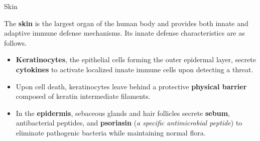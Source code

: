   \begin{core}{Skin}

    The \textbf{skin} is the largest organ of the human body and provides both innate and adaptive immune defense mechanisms. Its innate defense characteristics are as follows.

    \begin{itemize}

      \item \textbf{Keratinocytes}, the epithelial cells forming the outer epidermal layer, secrete \textbf{cytokines} to activate localized innate immune cells upon detecting a threat.

      \item Upon cell death, keratinocytes leave behind a protective \textbf{physical barrier} composed of keratin intermediate filaments.

      \item In the \textbf{epidermis}, sebaceous glands and hair follicles secrete \textbf{sebum}, antibacterial peptides, and \textbf{psoriasin} (\textit{a specific antimicrobial peptide}) to eliminate pathogenic bacteria while maintaining normal flora.

    \end{itemize}


  \end{core}

